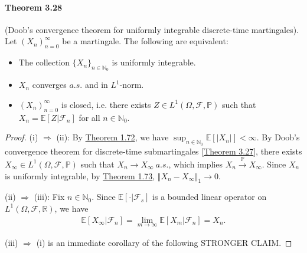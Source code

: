 \documentclass{article}
\numberwithin{equation}{section}
\newcommand{\E}{\mathbb{E}}
\renewcommand{\P}{\mathbb{P}}
\theoremstyle{plain}
\theoremstyle{definition}
\begin{document}
\paragraph{Theorem 3.28\label{thm:3.28}} (Doob's convergence theorem for uniformly integrable discrete-time martingales). Let $(X_n)_{n=0}^\infty$ be a martingale. The following are equivalent:
\begin{itemize}
	\item[(i)] The collection $\{X_n\}_{n\in\mathbb{N}_0}$ is uniformly integrable.
	\item[(ii)] $X_n$ converges $a.s.$ and in $L^1$-norm.
	\item[(iii)] $(X_n)_{n=0}^\infty$ is closed, i.e. there exists $Z\in L^1(\Omega,\mathscr{F},\P)$ such that $X_n=\E[Z|\mathscr{F}_n]$ for all $n\in\mathbb{N}_0$.
\end{itemize}
\begin{proof}
(i) $\Rightarrow$ (ii): By \hyperref[thm:1.72]{Theorem 1.72}, we have $\sup_{n\in\mathbb{N}_0}\E[\vert X_n\vert]<\infty$. By Doob's convergence theorem for discrete-time submartingales [\hyperref[thm:3.27]{Theorem 3.27}], there exists $X_\infty\in L^1(\Omega,\mathscr{F},\P)$ such that $X_n\to X_\infty\ a.s.$, which implies $X_n\overset{\P}{\to}X_\infty$. Since $X_n$ is uniformly integrable, by \hyperref[thm:1.73]{Theorem 1.73}, $\Vert X_n-X_\infty\Vert_1\to 0$. \vspace{0.1cm}

(ii) $\Rightarrow$ (iii): Fix $n\in\mathbb{N}_0$. Since $\E[\cdot|\mathscr{F}_s]$ is a bounded linear operator on $L^1(\Omega,\mathscr{F},\mathbb{R})$, we have
\begin{align*}
	\E[X_\infty|\mathscr{F}_n]=\lim_{m\to\infty}\E[X_m|\mathscr{F}_n]=X_n.
\end{align*}

(iii) $\Rightarrow$ (i) is an immediate corollary of the following STRONGER CLAIM. 
\end{proof}
\end{document}
